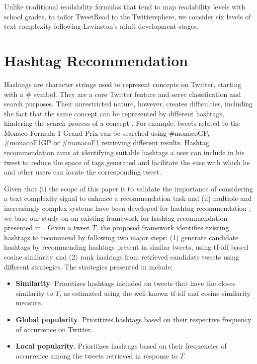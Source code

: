 \documentclass{sig-alternate-05-2015}
\begin{document}
Unlike traditional readability formulas that tend to map readability levels with school grades, to tailor TweetRead to the Twittersphere, we consider six levels of text complexity following Levinston's \cite{develop} adult development stages.

\section{Hashtag Recommendation}
Hashtags are character strings used to represent concepts on Twitter, starting with a \# symbol. They are a core Twitter feature and serve classification and search purposes. Their unrestricted nature, however, creates difficulties, including the fact that the same concept can be represented by different hashtags, hindering the search process of a concept \cite{hashtagRec}. For example, tweets related to the Monaco Formula 1 Grand Prix can be searched using \#monacoGP, \#monacoF1GP or \#monacoF1 retrieving different results. Hashtag recommendation aims at identifying suitable hashtags a user can include in his tweet to reduce the space of tags generated \cite{hashtagRec} and facilitate the ease with which he and other users can locate the corresponding tweet. 


Given that (i) the scope of this paper is to validate the importance of considering a text complexity signal to enhance a recommendation task and (ii) multiple and increasingly complex systems have been developed for hashtag recommendation \cite{lda}, we base our study on an existing framework for hashtag recommendation presented in \cite{hashtagRec}. Given a tweet $T$, the proposed framework identifies existing hashtags to recommend by following two major steps: (1) generate candidate hashtags by recommending hashtags present in similar tweets, using tf-idf based cosine similarity and (2) rank hashtags from retrieved candidate tweets using different strategies. The strategies presented in \cite{hashtagRec} include: 
\begin{itemize}
\item \textbf{Similarity}. Prioritizes hashtags included on tweets that have the closes similarity to $T$, as estimated using the well-known tf-idf and cosine similarity measure. 
\item \textbf{Global popularity}. Prioritizes hashtags based on their respective frequency of occurrence on Twitter. 
\item \textbf{Local popularity}. Prioritizes hashtags based on their frequencies of occurrence among the tweets retrieved in response to $T$. 
\end{itemize}
\end{document}
